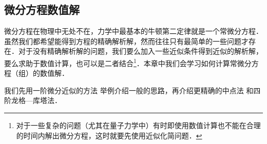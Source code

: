 \subsection{微分方程数值解}
微分方程在物理中无处不在，力学中最基本的牛顿第二定律就是一个常微分方程．虽然我们都希望能得到方程的精确解析解，然而往往只有最简单的一些问题才存在．对于没有精确解析解的问题，我们要么加入一些近似条件得到近似的解析解，要么求助于数值计算，也可以是二者结合\footnote{对于一些复杂的问题（尤其在量子力学中）有时即使用数值计算也不能在合理的时间内解出微分方程，这时就要先使用近似化简问题．}．本章中我们会学习如何计算常微分方程（组）的数值解．

我们先用一阶微分近似的方法 举例介绍一般的思路，再介绍更精确的中点法 和四阶龙格—库塔法．


